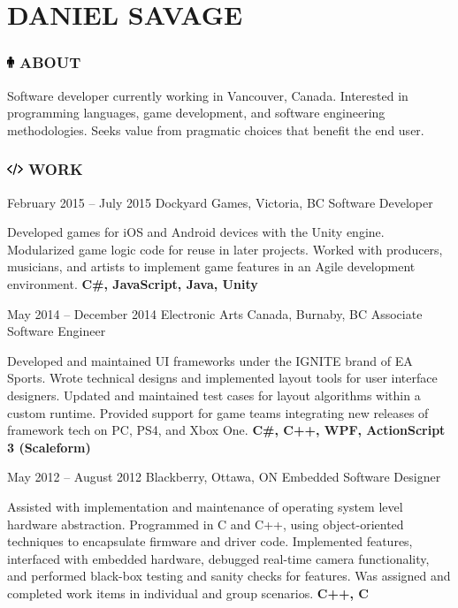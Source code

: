 \documentclass[10pt]{tccv}
\begin{document}
\part{DANIEL SAVAGE}

\flafamily

\section{\textcolor{black}{\includegraphics[height=10pt, keepaspectratio=true]{male}} ABOUT}

Software developer currently working in Vancouver, Canada. Interested in programming languages, game development, and software engineering methodologies. Seeks value from pragmatic choices that benefit the end user.

\section{\includegraphics[height=10pt, keepaspectratio=true]{code} WORK}

\begin{eventlist}

\item{February 2015 -- July 2015}
     {Dockyard Games, Victoria, BC}
     {Software Developer}
     
Developed games for iOS and Android devices with the Unity engine. Modularized game logic code for reuse in later projects. Worked with producers, musicians, and artists to implement game features in an Agile development environment. \textbf{C\#, JavaScript, Java, Unity}

\item{May 2014 -- December 2014}
     {Electronic Arts Canada, Burnaby, BC}
     {Associate Software Engineer}

Developed and maintained UI frameworks under the IGNITE brand of EA Sports. Wrote technical designs and implemented layout tools for user interface designers. Updated and maintained test cases for layout algorithms within a custom runtime. Provided support for game teams integrating new releases of framework tech on PC, PS4, and Xbox One. \textbf{C\#, C++, WPF, ActionScript 3 (Scaleform)}

\item{May 2012 -- August 2012}
     {Blackberry, Ottawa, ON}
     {Embedded Software Designer}

Assisted with implementation and maintenance of operating system level hardware abstraction. Programmed in C and C++, using object-oriented techniques to encapsulate firmware and driver code. Implemented features, interfaced with embedded hardware, debugged real-time camera functionality, and performed black-box testing and sanity checks for features. Was assigned and completed work items in individual and group scenarios. \textbf{C++, C}

\end{eventlist}
\end{document}
